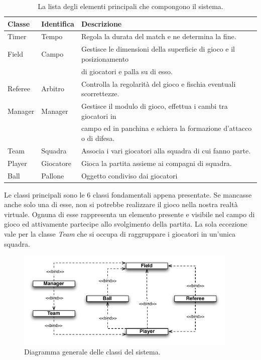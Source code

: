 \documentclass[aps,letterpaper,10pt]{article}
\begin{document}
\begin{table}[H]
\begin{center}
	\begin{tabular}{|l|l|l|}
		\hline
		\textbf{Classe} & \textbf{Identifica} & \textbf{Descrizione} \\ \hline \hline
		Timer & Tempo & Regola la durata del match e ne determina la fine. \\ \hline
		Field & Campo & Gestisce le dimensioni della superficie di gioco e il posizionamento \\
		& & di giocatori e palla su di esso. \\ \hline
		Referee & Arbitro & Controlla la regolarit\`a del gioco e fischia eventuali scorrettezze. \\ \hline
		Manager & Manager & Gestisce il modulo di gioco, effettua i cambi tra giocatori in \\
		& & campo ed in panchina e schiera la formazione d'attacco o di difesa. \\ \hline
		Team & Squadra & Associa i vari giocatori alla squadra di cui fanno parte. \\ \hline
		Player & Giocatore & Gioca la partita assieme ai compagni di squadra. \\ \hline
		Ball & Pallone & Oggetto condiviso dai giocatori \\ \hline
		\end{tabular}
\end{center}
\caption{La lista degli elementi principali che compongono il sistema.}
\end{table}

Le classi principali sono le 6 classi fondamentali appena presentate. Se mancasse anche solo una di esse, non si
potrebbe realizzare il gioco nella nostra realt\`a virtuale. Ognuna di esse rappresenta un elemento presente e visibile
nel campo di gioco ed attivamente partecipe allo svolgimento della partita. La sola eccezione vale per la classe
\emph{Team} che si occupa di raggruppare i giocatori in un'unica squadra. \vspace{3mm}

\begin{figure}[H]
	\begin{center}
		\includegraphics[width=400px]{images/relations-class-schema.pdf}
	\end{center}
\caption{Diagramma generale delle classi del sistema.}
\end{figure}
\end{document}
